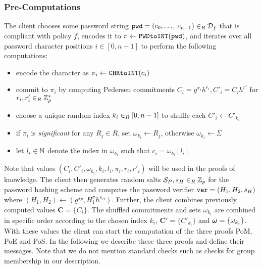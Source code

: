 \subsubsection{Pre-Computations}
The client chooses some password string $\mathtt{pwd}=(c_0,\ldots$, $c_{n-1})\in_R\mathcal{D}_f$ that is compliant with policy $f$, encodes it to $\pi\gets\texttt{PWDtoINT}(\mathtt{pwd})$, and iterates over all password character positions $i\in[0,n-1]$ to perform the following computations:
\begin{itemize}
  \item encode the character as $\pi_i\gets\texttt{CHRtoINT}(c_i)$
  \item commit to $\pi_i$ by computing Pedersen commitments $C_i=g^{\pi_i}h^{r_i}, C'_i=C_i h^{r'}$ for $r_i,r'_i\in_R\mathbb{Z}^\ast_p$
  \item choose a unique random index $k_{i} \in_R[0,n-1]$ to shuffle each $C'_i\gets C'_{k_i}$
  \item if $\pi_i$ is \emph{significant} for any $R_j\in R$, set $\omega_{k_i}\gets R_j$, otherwise $\omega_{k_i}\gets\Sigma$
  \item let $l_i\in\mathbb{N}$ denote the index in $\omega_{k_i}$ such that $c_i=\omega_{k_i}[l_i]$
\end{itemize}
Note that values $(C_i, C'_i, \omega_{k_i}, k_{i}, l_i, \pi_i, r_i, r'_i)$ will be used in the proofs of knowledge.
The client then generates random salts $\mathcal{S}_P,s_H\in_R\mathbb{Z}_p$ for the password hashing scheme and computes the password verifier $\mathtt{ver}=(H_1, H_2, s_H)$ where $(H_1,H_2)\gets (g^{s_P}, H_1^\pi h^{s_H})$.
Further, the client combines previously computed values $\bm C = \{C_{i}\}$.
The shuffled commitments and sets $\omega_{k_i}$ are combined in specific order according to the chosen index $k_i$, \ie $\bm C' = \{C'_{k_{i}}\}$ and $\boldsymbol{\mathbf{\omega}} = \{\omega_{k_i}\}$.
With these values the client can start the computation of the three proofs \ac{PoM}, \ac{PoE} and \ac{PoS}.
In the following we describe these three proofs and define their messages. Note that we do not mention standard checks such as checks for group membership in our description.

